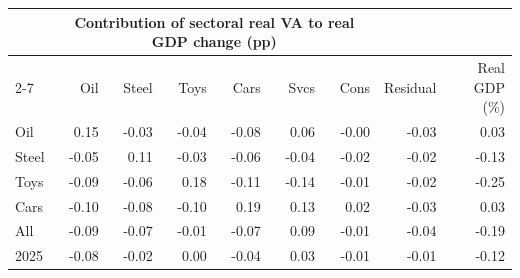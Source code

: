 \begin{tabular}{lrrrrrrrr}
\toprule
 & \multicolumn{6}{c}{Contribution of sectoral real VA to real GDP change (pp)} & & \\
\cmidrule(lr){2-7}
 & Oil & Steel & Toys & Cars & Svcs & Cons & Residual & Real GDP (\%) \\
\midrule
Oil & 0.15 & -0.03 & -0.04 & -0.08 & 0.06 & -0.00 & -0.03 & 0.03 \\
Steel & -0.05 & 0.11 & -0.03 & -0.06 & -0.04 & -0.02 & -0.02 & -0.13 \\
Toys & -0.09 & -0.06 & 0.18 & -0.11 & -0.14 & -0.01 & -0.02 & -0.25 \\
Cars & -0.10 & -0.08 & -0.10 & 0.19 & 0.13 & 0.02 & -0.03 & 0.03 \\
All & -0.09 & -0.07 & -0.01 & -0.07 & 0.09 & -0.01 & -0.04 & -0.19 \\
2025 & -0.08 & -0.02 & 0.00 & -0.04 & 0.03 & -0.01 & -0.01 & -0.12 \\
\bottomrule
\end{tabular}
